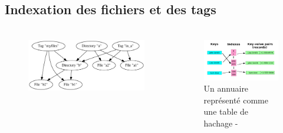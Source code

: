 \documentclass[10pt]{beamer}
\begin{document}
\subsection{Indexation des fichiers et des tags}
\begin{frame}
    \frametitle{\subsecname}
    \begin{columns}[T]
        \pause
        \begin{column}{.6\textwidth}
            \begin{figure}
                \begin{center}
                    \includegraphics[width=1\textwidth]{images/graph.png}
                \end{center}
            \end{figure}
        \end{column}
        \pause
        \begin{column}{.4\textwidth}
            \begin{figure}
                \begin{center}
                    \includegraphics[width=1\textwidth]{images/hashmap_wiki.png}
                    \caption{Un annuaire représenté comme une table de hachage - \cite{ref27}}
                \end{center}
            \end{figure}
        \end{column}
    \end{columns}
\end{frame}
\end{document}
